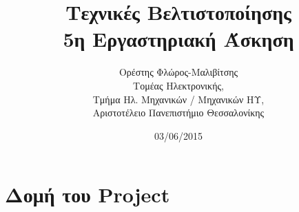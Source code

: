 \usepackage{longtable}

\usepackage{fontspec}
\setmainfont{DejaVu Serif}
\renewcommand{\contentsname}{Περιεχόμενα}
\renewcommand{\listfigurename}{Λίστα Σχημάτων}
\renewcommand{\figurename}{Σχήμα}
\renewcommand{\lstlistingname}{Καταχώρηση}%
\renewcommand{\lstlistlistingname}{List of \lstlistingname s}




\title{Τεχνικές Βελτιστοποίησης\\5η Εργαστηριακή Άσκηση}
\author{Ορέστης Φλώρος-Μαλιβίτσης\\
  Τομέας Ηλεκτρονικής,\\
  Τμήμα Ηλ. Μηχανικών / Μηχανικών ΗΥ,\\
  Αριστοτέλειο Πανεπιστήμιο Θεσσαλονίκης}
\date{03/06/2015}



\maketitle
\tableofcontents
\newpage

\chapter*{Δομή του Project} \label{project-structure}

